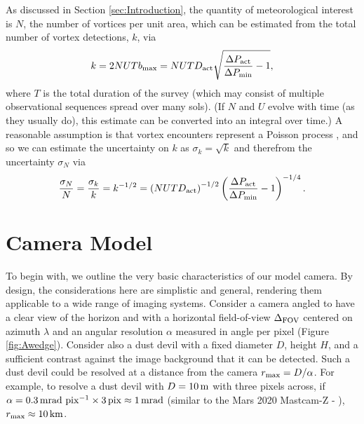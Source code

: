 \documentclass{aastex63}
\begin{document}
As discussed in Section \ref{sec:Introduction}, the quantity of meteorological interest is $N$, the number of vortices per unit area, which can be estimated from the total number of vortex detections, $k$, via
\begin{equation}
    k = 2 N U T b_{\rm max} = N U T D_{\rm act} \sqrt{ \frac{\Delta P_{\rm act}}{\Delta P_{\rm min}} - 1 }, \label{eqn:number_of_encounters}
\end{equation}
where $T$ is the total duration of the survey (which may consist of multiple observational sequences spread over many sols). (If $N$ and $U$ evolve with time (as they usually do), this estimate can be converted into an integral over time.) A reasonable assumption is that vortex encounters represent a Poisson process \citep[cf.][]{Press2007}, and so we can estimate the uncertainty on $k$ as $\sigma_k = \sqrt{k}$ and therefrom the uncertainty $\sigma_N$ via
\begin{equation}
    \frac{\sigma_N}{N} = \frac{\sigma_k}{k} = k^{-1/2} = \left ( N U T D_{\rm act} \right)^{-1/2} \left( \frac{\Delta P_{\rm act}}{\Delta P_{\rm min}} - 1 \right)^{-1/4}.
    \label{eqn:sigma_N}
\end{equation}

\section{Camera Model}
To begin with, we outline the very basic characteristics of our model camera. By design, the considerations here are simplistic and general, rendering them applicable to a wide range of imaging systems. Consider a camera angled to have a clear view of the horizon and with a horizontal field-of-view $\Delta_{\rm FOV}$ centered on azimuth $\lambda$ and an angular resolution $\alpha$ measured in angle per pixel (Figure \ref{fig:Awedge}). Consider also a dust devil with a fixed diameter $D$, height $H$, and a sufficient contrast against the image background that it can be detected. Such a dust devil could be resolved at a distance from the camera $r_{\rm max} = D/\alpha$. For example, to resolve a dust devil with $D = 10\,{\rm m}$ with three pixels across, if $\alpha = 0.3\,{\rm mrad\ pix^{-1}} \times 3\,{\rm pix} \approx 1\,{\rm mrad}$ (similar to the Mars 2020 Mastcam-Z - \citealp{2017E&SS....4..396B}), $r_{\rm max} \approx 10\,{\rm km}$.
\end{document}

